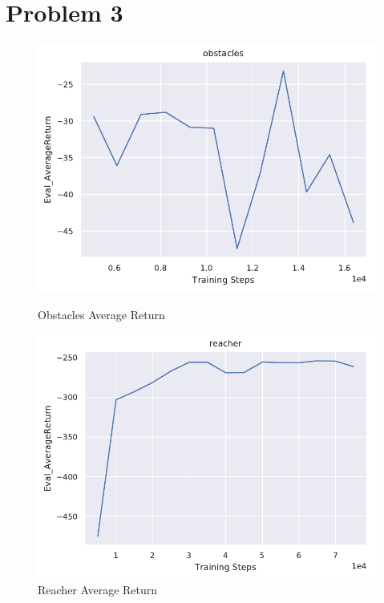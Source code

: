 \documentclass[letterpaper, 10pt]{article}
\begin{document}
\section*{Problem 3}
\begin{figure}[h]
	\centering
    \begin{minipage}{0.32\textwidth}
        \centering
        \includegraphics[width=\textwidth]{q3_obstacles.pdf}
        \caption{Obstacles Average Return}
    \end{minipage} \hfill
    \begin{minipage}{0.32\textwidth}
        \centering
        \includegraphics[width=\textwidth]{q3_reacher.pdf}
        \caption{Reacher Average Return}
    \end{minipage} \hfill
    \begin{minipage}{0.32\textwidth}

\end{minipage}
\end{figure}
\end{document}
